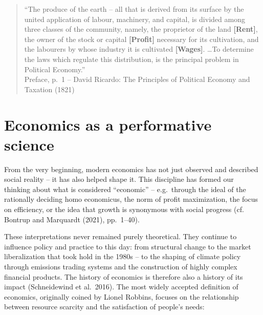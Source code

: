 \documentclass[
  a4paper,
  openany]{book}
\begin{document}
\begin{tcolorbox}[enhanced jigsaw, coltitle=black, bottomtitle=1mm, opacitybacktitle=0.6, titlerule=0mm, opacityback=0, leftrule=.75mm, colbacktitle=quarto-callout-note-color!10!white, bottomrule=.15mm, toptitle=1mm, breakable, title={Defining rent, profit, and wages}, arc=.35mm, rightrule=.15mm, toprule=.15mm, left=2mm, colback=white, colframe=quarto-callout-note-color-frame]

\begin{quote}
``The produce of the earth -- all that is derived from its surface by
the united application of labour, machinery, and capital, is divided
among three classes of the community, namely, the proprietor of the land
\textbf{{[}Rent{]}}, the owner of the stock or capital
\textbf{{[}Profit{]}} necessary for its cultivation, and the labourers
by whose industry it is cultivated \textbf{{[}Wages{]}}. \ldots To
determine the laws which regulate this distribution, is the principal
problem in Political Economy.''\\
Preface, p.~1 -- David Ricardo: The Principles of Political Economy and
Taxation (1821)
\end{quote}

\end{tcolorbox}

\section{Economics as a performative
science}\label{economics-as-a-performative-science}

From the very beginning, modern economics has not just observed and
described social reality -- it has also helped shape it. This discipline
has formed our thinking about what is considered ``economic'' --
e.g.~through the ideal of the rationally deciding homo economicus, the
norm of profit maximization, the focus on efficiency, or the idea that
growth is synonymous with social progress (cf. Bontrup and Marquardt
(2021), pp.~1--40).

These interpretations never remained purely theoretical. They continue
to influence policy and practice to this day: from structural change to
the market liberalization that took hold in the 1980s -- to the shaping
of climate policy through emissions trading systems and the construction
of highly complex financial products. The history of economics is
therefore also a history of its impact (Schneidewind et al.~2016). The
most widely accepted definition of economics, originally coined by
Lionel Robbins, focuses on the relationship between resource scarcity
and the satisfaction of people's needs:
\end{document}

